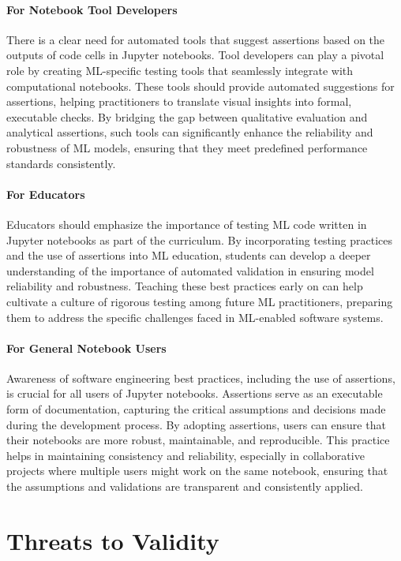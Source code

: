 \paragraph{\textbf{For Notebook Tool Developers}} There is a clear need for automated tools that suggest assertions based on the outputs of code cells in Jupyter notebooks. Tool developers can play a pivotal role by creating ML-specific testing tools that seamlessly integrate with computational notebooks. These tools should provide automated suggestions for assertions, helping practitioners to translate visual insights into formal, executable checks. By bridging the gap between qualitative evaluation and analytical assertions, such tools can significantly enhance the reliability and robustness of ML models, ensuring that they meet predefined performance standards consistently.

\paragraph{\textbf{For Educators}} Educators should emphasize the importance of testing ML code written in Jupyter notebooks as part of the curriculum. By incorporating testing practices and the use of assertions into ML education, students can develop a deeper understanding of the importance of automated validation in ensuring model reliability and robustness. Teaching these best practices early on can help cultivate a culture of rigorous testing among future ML practitioners, preparing them to address the specific challenges faced in ML-enabled software systems.

\paragraph{\textbf{For General Notebook Users}} Awareness of software engineering best practices, including the use of assertions, is crucial for all users of Jupyter notebooks. Assertions serve as an executable form of documentation, capturing the critical assumptions and decisions made during the development process. By adopting assertions, users can ensure that their notebooks are more robust, maintainable, and reproducible. This practice helps in maintaining consistency and reliability, especially in collaborative projects where multiple users might work on the same notebook, ensuring that the assumptions and validations are transparent and consistently applied.

\section{Threats to Validity}\label{sec:threats}


